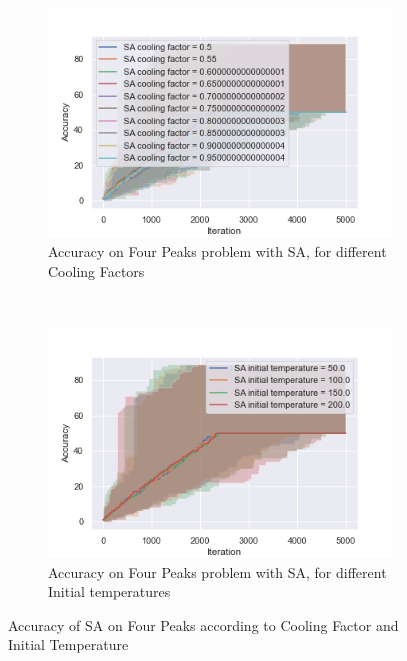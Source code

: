 \documentclass[twocolumn, 10pt]{article}
\begin{document}
				\begin{figure}[h]
					\centering
					\begin{subfigure}[t]{0.45\columnwidth}
						\centering
						\includegraphics[width=\linewidth]{../graphics/four_peaks_SA_Iteration_Error_SA_cooling_factor.png}
						\caption{Accuracy on Four Peaks problem with SA, for different Cooling Factors}
						\label{fp:sa_cooling}
					\end{subfigure}
					~
					\begin{subfigure}[t]{0.45\columnwidth}
						\centering
						\includegraphics[width=\linewidth]{../graphics/four_peaks_SA_Iteration_Error_SA_initial_temperature.png}
						\caption{Accuracy on Four Peaks problem with SA, for different Initial temperatures}
						\label{fp:sa_initial_temp}
					\end{subfigure}
					\caption{Accuracy of SA on Four Peaks according to Cooling Factor and Initial Temperature}
					\label{fp:sa}
				\end{figure}
\end{document}
